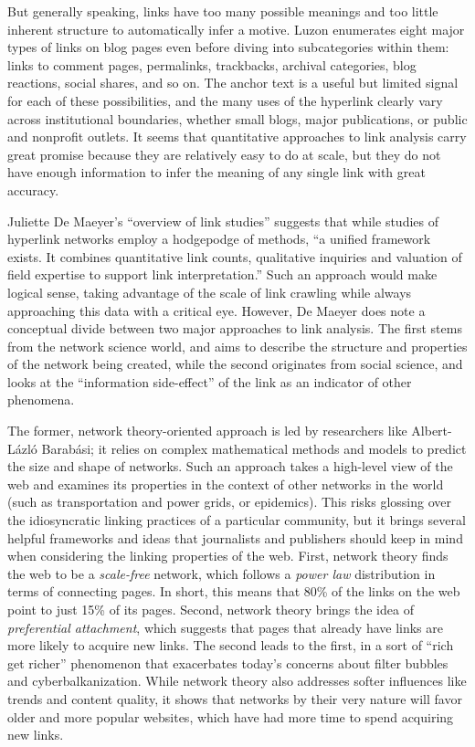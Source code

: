 But generally speaking, links have too many possible meanings and too little inherent structure to automatically infer a motive. Luzon enumerates eight major types of links on blog pages even before diving into subcategories within them: links to comment pages, permalinks, trackbacks, archival categories, blog reactions, social shares, and so on.\autocite[79]{luzon_scholarly_2009} The anchor text is a useful but limited signal for each of these possibilities, and the many uses of the hyperlink clearly vary across institutional boundaries, whether small blogs, major publications, or public and nonprofit outlets. It seems that quantitative approaches to link analysis carry great promise because they are relatively easy to do at scale, but they do not have enough information to infer the meaning of any single link with great accuracy.

Juliette De Maeyer's ``overview of link studies'' suggests that while studies of hyperlink networks employ a hodgepodge of methods, ``a unified framework exists. It combines quantitative link counts, qualitative inquiries and valuation of field expertise to support link interpretation.''\autocite[737]{de_maeyer_towards_2013} Such an approach would make logical sense, taking advantage of the scale of link crawling while always approaching this data with a critical eye. However, De Maeyer does note a conceptual divide between two major approaches to link analysis. The first stems from the network science world, and aims to describe the structure and properties of the network being created, while the second originates from social science, and looks at the ``information side-effect'' of the link as an indicator of other phenomena.

The former, network theory-oriented approach is led by researchers like Albert-L\'{a}zl\'{o} Barab\'{a}si; it relies on complex mathematical methods and models to predict the size and shape of networks. Such an approach takes a high-level view of the web and examines its properties in the context of other networks in the world (such as transportation and power grids, or epidemics). This risks glossing over the idiosyncratic linking practices of a particular community, but it brings several helpful frameworks and ideas that journalists and publishers should keep in mind when considering the linking properties of the web. First, network theory finds the web to be a \emph{scale-free} network, which follows a \emph{power law} distribution in terms of connecting pages. In short, this means that 80\% of the links on the web point to just 15\% of its pages.\autocite[``The 80/20 Rule'']{barabasi_linked:_2003} Second, network theory brings the idea of \emph{preferential attachment}, which suggests that pages that already have links are more likely to acquire new links. The second leads to the first, in a sort of ``rich get richer'' phenomenon that exacerbates today's concerns about filter bubbles and cyberbalkanization. While network theory also addresses softer influences like trends and content quality, it shows that networks by their very nature will favor older and more popular websites, which have had more time to spend acquiring new links.

